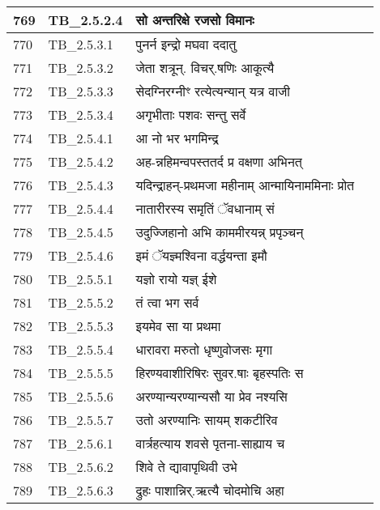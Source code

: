 \documentclass[17pt]{extarticle}
\begin{document}
\begin{longtable}{||p{0.4in}||p{0.9in}||p{4.0in}||p{0.9in}||}
        \hline
            769 & TB\_2.5.2.4 & सो अन्तरिक्षे रजसो विमानः &      \\
        \hline
            770 & TB\_2.5.3.1 & पुनर्न इन्द्रो मघवा ददातु &      \\
        \hline
            771 & TB\_2.5.3.2 & जेता शत्रून्. विचर्.षणिः आकूत्यै &      \\
        \hline
            772 & TB\_2.5.3.3 & सेदग्निरग्नीꣳ रत्येत्यन्यान् यत्र वाजी &      \\
        \hline
            773 & TB\_2.5.3.4 & अगृभीताः पशवः सन्तु सर्वे &      \\
        \hline
            774 & TB\_2.5.4.1 & आ नो भर भगमिन्द्र &      \\
        \hline
            775 & TB\_2.5.4.2 & अह{-}न्नहिमन्वपस्ततर्द प्र वक्षणा अभिनत् &      \\
        \hline
            776 & TB\_2.5.4.3 & यदिन्द्राहन्{-}प्रथमजा महीनाम् आन्मायिनाममिनाः प्रोत &      \\
        \hline
            777 & TB\_2.5.4.4 & नातारीरस्य समृतिं ॅवधानाम् सं &      \\
        \hline
            778 & TB\_2.5.4.5 & उदुज्जिहानो अभि काममीरयन्न् प्रपृञ्चन् &      \\
        \hline
            779 & TB\_2.5.4.6 & इमं ॅयज्ञ्मश्विना वर्द्धयन्ता इमौ &      \\
        \hline
            780 & TB\_2.5.5.1 & यज्ञो रायो यज्ञ् ईशे &      \\
        \hline
            781 & TB\_2.5.5.2 & तं त्वा भग सर्व &      \\
        \hline
            782 & TB\_2.5.5.3 & इयमेव सा या प्रथमा &      \\
        \hline
            783 & TB\_2.5.5.4 & धारावरा मरुतो धृष्णुवोजसः मृगा &      \\
        \hline
            784 & TB\_2.5.5.5 & हिरण्यवाशीरिषिरः सुवर.षाः बृहस्पतिः स &      \\
        \hline
            785 & TB\_2.5.5.6 & अरण्यान्यरण्यान्यसौ या प्रेव नश्यसि &      \\
        \hline
            786 & TB\_2.5.5.7 & उतो अरण्यानिः सायम् शकटीरिव &      \\
        \hline
            787 & TB\_2.5.6.1 & वार्त्रहत्याय शवसे पृतना{-}साह्याय च &      \\
        \hline
            788 & TB\_2.5.6.2 & शिवे ते द्यावापृथिवी उभे &      \\
        \hline
            789 & TB\_2.5.6.3 & द्रुहः पाशान्निर्.ऋत्यै चोदमोचि अहा &      \\

\end{longtable}
\end{document}
